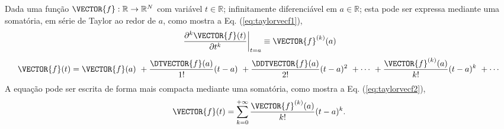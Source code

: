 \begin{proposition}\label{prop:taylorvecf}
Dada uma função $\VECTOR{f}:\mathbb{R}\rightarrow \mathbb{R}^{N}$ com variável $t \in \mathbb{R}$;
infinitamente diferenciável em $a \in \mathbb{R}$;
esta pode ser expressa mediante uma somatória, em série de Taylor 
\cite[pp. 264]{joag2016introduction}
ao redor de $a$, como
mostra a Eq. (\ref{eq:taylorvecf1}),
\begin{equation}\label{eq:taylorvecf0a}
\left.\frac{\partial^k \VECTOR{f}(t)}{\partial t^k}\right|_{t=a}\equiv \VECTOR{f}^{(k)}(a) 
\end{equation}
\begin{equation}\label{eq:taylorvecf1}
  \VECTOR{f}(t)=\VECTOR{f}(a)
      ~+\frac{\DTVECTOR{f}(a)}{1!} (t-a)
      ~+\frac{\DDTVECTOR{f}(a)}{2!} (t-a)^{2}
      ~+\cdots 
      ~+\frac{\VECTOR{f}^{(k)}(a)}{k!} (t-a)^{k}
      ~+\cdots 
\end{equation}
A equação pode ser escrita de forma mais compacta mediante uma somatória, como mostra a Eq. (\ref{eq:taylorvecf2}),
\begin{equation}\label{eq:taylorvecf2}
  \VECTOR{f}(t)=\sum\limits_{k=0}^{+\infty} \frac{\VECTOR{f}^{(k)}(a)}{k!} (t-a)^{k}.
\end{equation}
\end{proposition}

